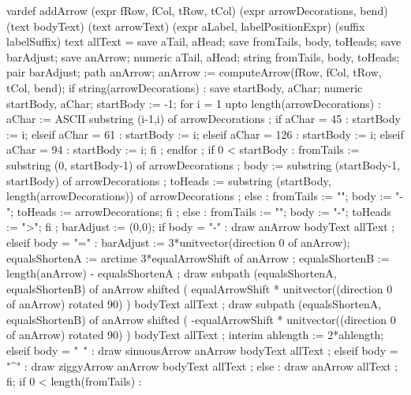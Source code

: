   vardef addArrow
    (expr fRow, fCol, tRow, tCol)
    (expr arrowDecorations, bend)
    (text bodyText)
    (text arrowText)
    (expr aLabel, labelPositionExpr)
    (suffix labelSuffix)
    text allText =
    save aTail, aHead;
    save fromTails, body, toHeads;
    save barAdjust;
    save anArrow;
    numeric aTail, aHead;
    string fromTails, body, toHeads;
    pair barAdjust;
    path anArrow;
    anArrow := computeArrow(fRow, fCol, tRow, tCol, bend);
    if string(arrowDecorations) :
      save startBody, aChar; numeric startBody, aChar;
      startBody  := -1;
      for i = 1 upto length(arrowDecorations) :
        aChar := ASCII substring (i-1,i) of arrowDecorations ; 
        if aChar = 45 : %
          startBody := i;
        elseif aChar = 61 : %
          startBody := i;
        elseif aChar = 126 : %
          startBody := i;
        elseif aChar = 94 : %
          startBody := i;
        fi ;
      endfor ; 
      if 0 < startBody :
        fromTails := 
          substring (0, startBody-1)
          of arrowDecorations ;
        body      :=
          substring (startBody-1, startBody)
          of arrowDecorations ;
        toHeads   := 
          substring (startBody, length(arrowDecorations)) 
          of arrowDecorations ;
      else : 
        fromTails := "";
        body      := "-";
        toHeads   := arrowDecorations;
      fi ;
    else :
      fromTails := "";
      body      := "-";
      toHeads   := ">";
    fi ;
    barAdjust := (0,0);
    if body = "-" :
      draw anArrow bodyText allText ; 
    elseif body = "=" :
      barAdjust := 3*unitvector(direction 0 of anArrow);
      equalsShortenA := arctime 3*equalArrowShift of anArrow ;
      equalsShortenB := length(anArrow) - equalsShortenA ;
      draw subpath (equalsShortenA, equalsShortenB) of anArrow
        shifted (
          equalArrowShift *
          unitvector((direction 0 of anArrow) rotated 90)
        )
        bodyText allText ;
      draw subpath (equalsShortenA, equalsShortenB) of anArrow
        shifted (
          -equalArrowShift *
          unitvector((direction 0 of anArrow) rotated 90)
        )
        bodyText allText ;
      interim ahlength := 2*ahlength;
    elseif body = "~" :
      draw sinuousArrow anArrow bodyText allText ;
    elseif body = "^" :
      draw ziggyArrow anArrow bodyText allText ;
    else :
      draw anArrow allText ; 
    fi;
    if 0 < length(fromTails) :
